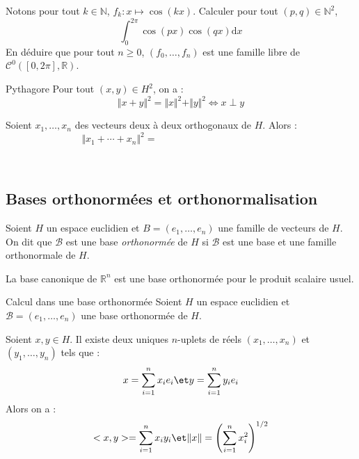 \documentclass[french,11pt,twoside]{VcCours}
\newcommand{\dx}{\text{d}x}
\begin{document}
\begin{Demonstration}{}
\vspace{5cm}
\end{Demonstration}

\begin{ApplicationDirecte}{} Notons pour tout $k \in \mathbb{N}$, $f_k : x \mapsto \cos(kx)$. Calculer pour tout $(p,q) \in \mathbb{N}^2$,
$$ \int_{0}^{2 \pi} \cos(px) \cos(qx) \dx$$
En déduire que pour tout $n \geq 0$, $(f_0, \ldots, f_n)$ est une famille libre de $\mathcal{C}^0([0,2 \pi],\mathbb{R})$.
\end{ApplicationDirecte}

\begin{Theoreme}{Pythagore}
Pour tout $(x,y) \in H^2$, on a :
$$ \Vert x+y \Vert^2 = \Vert x \Vert^2 + \Vert y \Vert^2 \Longleftrightarrow x \perp y $$
\end{Theoreme}

\begin{Demonstration}{}
\vspace{3cm}
\end{Demonstration}

\begin{Remarque}{} Soient $x_1, \ldots, x_n$ des vecteurs deux à deux orthogonaux de $H$. Alors :
$$ \Vert x_1 + \cdots + x_n \Vert^2 = \phantom{blablablablablablablablablabla}$$

\vspace*{2cm}~

\end{Remarque}

\subsection{Bases orthonormées et orthonormalisation}
\begin{Definition}{} Soient $H$ un espace euclidien et $B= (e_1, \ldots, e_n)$ une famille de vecteurs de $H$. On dit que $\mathcal{B}$ est une base \emph{orthonormée} de $H$ si $\mathcal{B}$ est une base et une famille orthonormale de $H$.
\end{Definition}

\begin{Exemple}{} La base canonique de $\mathbb{R}^n$ est une base orthonormée pour le produit scalaire usuel.
\end{Exemple}

\begin{Proposition}{Calcul dans une base orthonormée}
Soient $H$ un espace euclidien et $\mathcal{B}=(e_1, \ldots, e_n)$ une base orthonormée de $H$.

Soient $x,y \in H$. Il existe deux uniques $n$-uplets de réels $(x_1, \ldots, x_n)$ et $(y_1, \ldots, y_n)$ tels que :
$$ x = \sum_{i=1}^n x_i e_i \et y = \sum_{i=1}^n y_i e_i $$
Alors on a :
$$ <x,y> = \sum_{i=1}^n x_i y_i \et  \Vert x \Vert = \left( \sum_{i=1}^n x_i^2 \right)^{1/2} $$
\end{Proposition}
\end{document}
